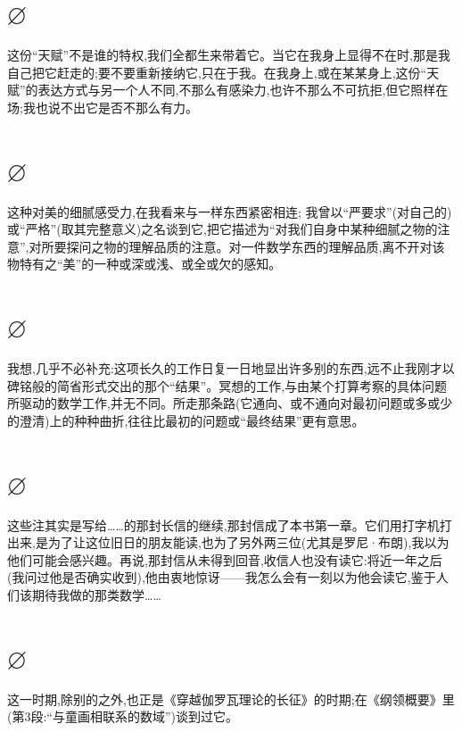 \section{$\varnothing$}

这份“天赋”不是谁的特权,我们全都生来带着它。当它在我身上显得不在时,那是我自己把它赶走的;要不要重新接纳它,只在于我。在我身上,或在某某身上,这份“天赋”的表达方式与另一个人不同,不那么有感染力,也许不那么不可抗拒,但它照样在场;我也说不出它是否不那么有力。

\section{$\varnothing$}

这种对美的细腻感受力,在我看来与一样东西紧密相连;
我曾以“严要求”(对自己的)或“严格”(取其完整意义)之名谈到它,把它描述为“对我们自身中某种细腻之物的注意”,对所要探问之物的理解品质的注意。对一件数学东西的理解品质,离不开对该物特有之“美”的一种或深或浅、或全或欠的感知。

\section{$\varnothing$}

我想,几乎不必补充:这项长久的工作日复一日地显出许多别的东西,远不止我刚才以碑铭般的简省形式交出的那个“结果”。冥想的工作,与由某个打算考察的具体问题所驱动的数学工作,并无不同。所走那条路(它通向、或不通向对最初问题或多或少的澄清)上的种种曲折,往往比最初的问题或“最终结果”更有意思。

\section{$\varnothing$}

这些注其实是写给……的那封长信的继续,那封信成了本书第一章。它们用打字机打出来,是为了让这位旧日的朋友能读,也为了另外两三位(尤其是罗尼·布朗),我以为他们可能会感兴趣。再说,那封信从未得到回音,收信人也没有读它:将近一年之后(我问过他是否确实收到),他由衷地惊讶——我怎么会有一刻以为他会读它,鉴于人们该期待我做的那类数学……

\section{$\varnothing$}

这一时期,除别的之外,也正是《穿越伽罗瓦理论的长征》的时期;在《纲领概要》里(第3段:“与童画相联系的数域”)谈到过它。

